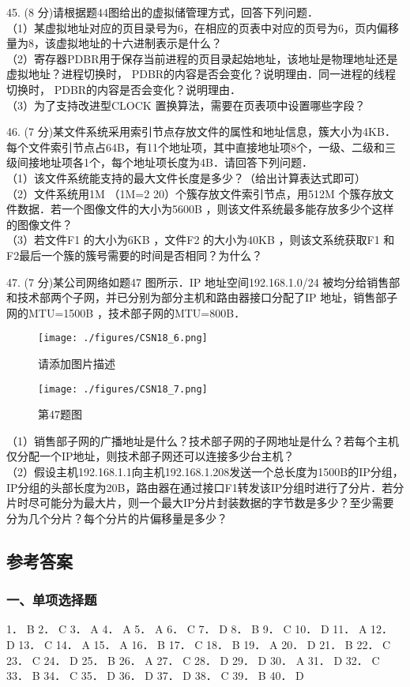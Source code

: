 45. (8 分)请根据题44图给出的虚拟储管理方式，回答下列问题． \\
（1）某虚拟地址对应的页目录号为6，在相应的页表中对应的页号为6，页内偏移量为8，该虚拟地址的十六进制表示是什么？ \\
（2）寄存器PDBR用于保存当前进程的页目录起始地址，该地址是物理地址还是虚拟地址？进程切换时， PDBR的内容是否会变化？说明理由．同一进程的线程切换时， PDBR的内容是否会变化？说明理由． \\
（3）为了支持改进型CLOCK 置换算法，需要在页表项中设置哪些字段？

46. (7 分)某文件系统采用索引节点存放文件的属性和地址信息，簇大小为4KB．每个文件索引节点占64B，有11个地址项，其中直接地址项8个，一级、二级和三级间接地址项各1个，每个地址项长度为4B．请回答下列问题． \\
（1）该文件系统能支持的最大文件长度是多少？（给出计算表达式即可） \\
（2）文件系统用1M （1M=2 20）个簇存放文件索引节点，用512M 个簇存放文件数据．若一个图像文件的大小为5600B ，则该文件系统最多能存放多少个这样的图像文件？ \\
（3）若文件F1 的大小为6KB ，文件F2 的大小为40KB ，则该文系统获取F1 和F2最后一个簇的簇号需要的时间是否相同？为什么？

47. (7 分)某公司网络如题47 图所示．IP 地址空间192.168.1.0/24 被均分给销售部和技术部两个子网，并已分别为部分主机和路由器接口分配了IP 地址，销售部子网的MTU=1500B ，技术部子网的MTU=800B．
\begin{figure}[ht]
\centering
\texttt{[image: ./figures/CSN18\_6.png]}
\caption{请添加图片描述} \label{CSN18_fig6}
\end{figure}
\begin{figure}[ht]
\centering
\texttt{[image: ./figures/CSN18\_7.png]}
\caption{第47题图} \label{CSN18_fig7}
\end{figure}
（1）销售部子网的广播地址是什么？技术部子网的子网地址是什么？若每个主机仅分配一个IP地址，则技术部子网还可以连接多少台主机？ \\
（2）假设主机192.168.1.1向主机192.168.1.208发送一个总长度为1500B的IP分组，IP分组的头部长度为20B，路由器在通过接口F1转发该IP分组时进行了分片．若分片时尽可能分为最大片，则一个最大IP分片封装数据的字节数是多少？至少需要分为几个分片？每个分片的片偏移量是多少？

\subsection{参考答案}
\subsubsection{一、单项选择题}
1． B 2． C 3． A 4． A 5． A 6． C 7． D 8． B
9． C 10． D 11． A 12． D 13． C 14． A 15． A 16． B
17． C 18． B 19． A 20． D 21． B 22． C 23． C 24． D
25． B 26． A 27． C 28． D 29． D 30． A 31． D 32． C
33． B 34． C 35． D 36． D 37． D 38． C 39． B 40． D
